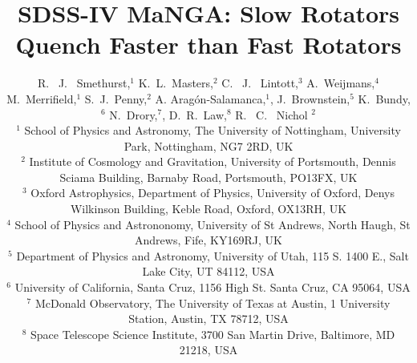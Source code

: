 \documentclass[useAMS,usenatbib]{mn2e}
\begin{document}
\title[Quenching Histories of Fast and Slow Rotators]{SDSS-IV MaNGA: Slow Rotators Quench Faster than Fast Rotators}
\author[Smethurst et al. 2017]{R. ~J. ~Smethurst,$^{1}$ K.~L.~Masters,$^{2}$  C. ~J. ~Lintott,$^{3}$ A.~Weijmans,$^{4}$  M.~Merrifield,$^{1}$ \newauthor S.~J.~Penny,$^{2}$ A. Arag\'on-Salamanca,$^{1}$,  J.~Brownstein,$^{5}$ K.~Bundy,$^{6}$  N.~Drory,$^{7}$, \newauthor  D.~R.~Law,$^{8}$ R. ~C. ~Nichol $^{2}$ 
\\ $^1$ School of Physics and Astronomy, The University of Nottingham, University Park, Nottingham, NG7 2RD, UK
\\ $^2$ Institute of Cosmology and Gravitation, University of Portsmouth, Dennis Sciama Building, Barnaby Road, Portsmouth, PO13FX, UK 
\\ $^3$ Oxford Astrophysics, Department of Physics, University of Oxford, Denys Wilkinson Building, Keble Road, Oxford, OX13RH, UK
\\ $^4$ School of Physics and Astrononomy, University of St Andrews, North Haugh, St Andrews, Fife, KY169RJ, UK
\\ $^5$ Department of Physics and Astronomy, University of Utah, 115 S. 1400 E., Salt Lake City, UT 84112, USA
\\ $^6$ 	University of California, Santa Cruz, 1156 High St. Santa Cruz, CA 95064, USA
\\ $^7$ McDonald Observatory, The University of Texas at Austin, 1 University Station, Austin, TX 78712, USA
\\ $^8$ Space Telescope Science Institute, 3700 San Martin Drive, Baltimore, MD 21218, USA
}

\maketitle
\end{document}
